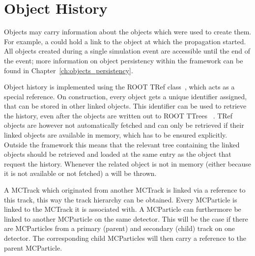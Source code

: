 \section{Object History}
\label{sec:objhistory}

Objects may carry information about the objects which were used to create them.
For example, a  could hold a link to the  object at which the propagation started.
All objects created during a single simulation event are accessible until the end of the event; more information on object persistency within the framework can be found in Chapter~\ref{ch:objects_persistency}.

Object history is implemented using the ROOT TRef class~\cite{roottref}, which acts as a special reference.
On construction, every object gets a unique identifier assigned, that can be stored in other linked objects.
This identifier can be used to retrieve the history, even after the objects are written out to ROOT TTrees ~\cite{roottree}.
TRef objects are however not automatically fetched and can only be retrieved if their linked objects are available in memory, which has to be ensured explicitly.
Outside the framework this means that the relevant tree containing the linked objects should be retrieved and loaded at the same entry as the object that request the history.
Whenever the related object is not in memory (either because it is not available or not fetched) a  will be thrown.

A MCTrack which originated from another MCTrack is linked via a reference to this track, this way the track hierarchy can be obtained.
Every MCParticle is linked to the MCTrack it is associated with.
A MCParticle can furthermore be linked to another MCParticle on the same detector.
This will be the case if there are MCParticles from a primary (parent) and secondary (child) track on one detector.
The corresponding child MCParticles will then carry a reference to the parent MCParticle.
